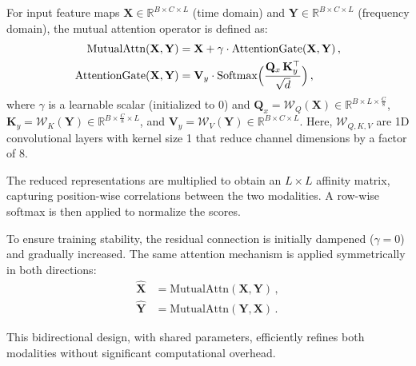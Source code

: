 \documentclass[conference]{IEEEtran}
\begin{document}
For input feature maps $\mathbf{X} \in \mathbb{R}^{B \times C \times L}$ (time domain) and $\mathbf{Y} \in \mathbb{R}^{B \times C \times L}$ (frequency domain), the mutual attention operator is defined as:
\begin{equation}
    \begin{aligned}
        \text{MutualAttn}(\mathbf{X}, \mathbf{Y}) &= \mathbf{X} + \gamma \cdot \text{AttentionGate}(\mathbf{X}, \mathbf{Y}) \,, \\
        \text{AttentionGate}(\mathbf{X}, \mathbf{Y}) &= \mathbf{V}_y \cdot \text{Softmax}\Bigl(\frac{\mathbf{Q}_x\, \mathbf{K}_y^\top}{\sqrt{d}}\Bigr)\,,
    \end{aligned}
\end{equation}
where $\gamma$ is a learnable scalar (initialized to 0) and $\mathbf{Q}_x = \mathcal{W}_Q(\mathbf{X}) \in \mathbb{R}^{B \times L \times \frac{C}{8}}$, $\mathbf{K}_y = \mathcal{W}_K(\mathbf{Y}) \in \mathbb{R}^{B \times \frac{C}{8} \times L}$, and $\mathbf{V}_y = \mathcal{W}_V(\mathbf{Y}) \in \mathbb{R}^{B \times C \times L}$. Here, $\mathcal{W}_{Q,K,V}$ are 1D convolutional layers with kernel size 1 that reduce channel dimensions by a factor of 8.

The reduced representations are multiplied to obtain an $L \times L$ affinity matrix, capturing position-wise correlations between the two modalities. A row-wise softmax is then applied to normalize the scores.

To ensure training stability, the residual connection is initially dampened ($\gamma=0$) and gradually increased. The same attention mechanism is applied symmetrically in both directions:
\begin{equation}
    \begin{aligned}
        \widehat{\mathbf{X}} &= \text{MutualAttn}(\mathbf{X}, \mathbf{Y})\,, \\
        \widehat{\mathbf{Y}} &= \text{MutualAttn}(\mathbf{Y}, \mathbf{X})\,.
    \end{aligned}
\end{equation}

This bidirectional design, with shared parameters, efficiently refines both modalities without significant computational overhead.

\end{document}
